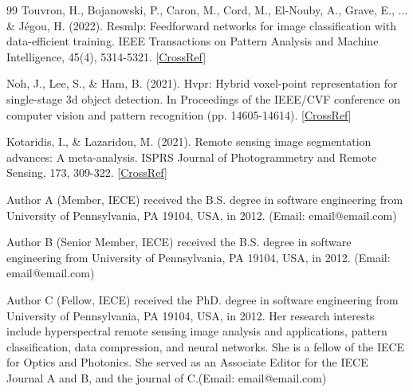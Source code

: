 \documentclass[twocolumn]{IECEjournal} %
\begin{document}
\begin{fullwidth}
\begin{thebibliography}{99}
 Touvron, H., Bojanowski, P., Caron, M., Cord, M., El-Nouby, A., Grave, E., ... \& Jégou, H. (2022). Resmlp: Feedforward networks for image classification with data-efficient training. IEEE Transactions on Pattern Analysis and Machine Intelligence, 45(4), 5314-5321. [\href{https://doi.org/10.1109/TPAMI.2022.3206148}{CrossRef}]

 Noh, J., Lee, S., \& Ham, B. (2021). Hvpr: Hybrid voxel-point representation for single-stage 3d object detection. In Proceedings of the IEEE/CVF conference on computer vision and pattern recognition (pp. 14605-14614). [\href{https://doi.org/10.1109/CVPR46437.2021.01437}{CrossRef}]

 Kotaridis, I., \& Lazaridou, M. (2021). Remote sensing image segmentation advances: A meta-analysis. ISPRS Journal of Photogrammetry and Remote Sensing, 173, 309-322. [\href{https://doi.org/10.1016/j.isprsjprs.2021.01.020}{CrossRef}]

\end{thebibliography}
\end{fullwidth}

\makeatletter
\if@twocolumn

  \begin{biography}[author1]{Author A} (Member, IECE) received the B.S. degree in software engineering from University of Pennsylvania, PA 19104, USA, in 2012. (Email: email@email.com)
  \end{biography}

  \begin{biography}[author2]{Author B} (Senior Member, IECE) received the B.S. degree in software engineering from University of Pennsylvania, PA 19104, USA, in 2012. (Email: email@email.com)
  \end{biography}

  \begin{biography}[author3]{Author C} (Fellow, IECE) received the PhD. degree in software engineering from University of Pennsylvania, PA 19104, USA, in 2012. Her research interests include hyperspectral remote sensing image analysis and applications, pattern classification, data compression, and neural networks. She is a fellow of the IECE for Optics and Photonics. She served as an Associate Editor for the IECE Journal A and B, and the journal of C.(Email: email@email.com)
  \end{biography}

\else

\fi

\makeatother
\end{document}
